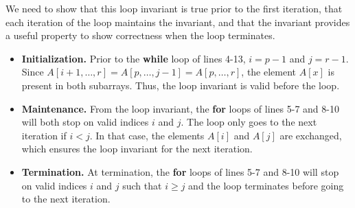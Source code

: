 \documentclass{report}
\makeatletter
\renewenvironment{framed}{%
 \def\FrameCommand##1{\hskip\@totalleftmargin
 \fboxsep=\FrameSep\fbox{##1}}%
 \MakeFramed {\advance\hsize-\width
   \@totalleftmargin\z@ \linewidth\hsize
   \@setminipage}}%
 {\par\unskip\endMakeFramed}
\makeatother
\begin{document}
\begin{enumerate}
\begin{framed}
\begin{enumerate}
{We need to show that this loop invariant is true prior to the first iteration,
that each iteration of the loop maintains the invariant, and that the invariant
provides a useful property to show correctness when the loop terminates.
\begin{itemize}
  \item \textbf{Initialization.} Prior to the \textbf{while} loop of lines 4-13,
    $i = p - 1$ and $j = r - 1$. Since
    $A[i + 1, \dots, r] = A[p, \dots, j - 1] = A[p, \dots, r]$, the
    element $A[x]$ is present in both subarrays. Thus, the loop invariant is
    valid before the loop.
  \item \textbf{Maintenance.} From the loop invariant, the \textbf{for} loops of
    lines 5-7 and 8-10 will both stop on valid indices $i$ and $j$. The loop
    only goes to the next iteration if $i < j$. In that case, the elements
    $A[i]$ and $A[j]$ are exchanged, which ensures the loop invariant for the
    next iteration.
  \item \textbf{Termination.} At termination, the \textbf{for} loops of lines
    5-7 and 8-10 will stop on valid indices $i$ and $j$ such that $i \ge j$ and
    the loop terminates before going to the next iteration.
\end{itemize}

}
\end{enumerate}
\end{framed}
\end{enumerate}
\end{document}
